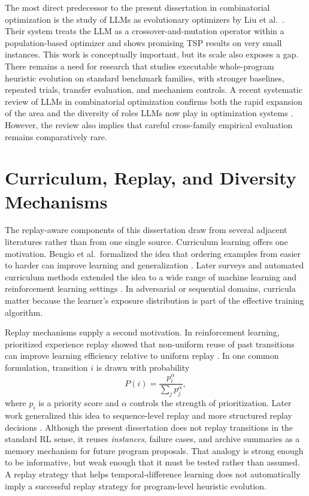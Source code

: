 The most direct predecessor to the present dissertation in combinatorial optimization is the study
of LLMs as evolutionary optimizers by Liu et al.\ \cite{liu2023lmea}. Their system treats the LLM
as a crossover-and-mutation operator within a population-based optimizer and shows promising TSP
results on very small instances. This work is conceptually important, but its scale also exposes a
gap. There remains a need for research that studies executable whole-program heuristic evolution on
standard benchmark families, with stronger baselines, repeated trials, transfer evaluation, and
mechanism controls. A recent systematic review of LLMs in combinatorial optimization confirms both
the rapid expansion of the area and the diversity of roles LLMs now play in optimization systems
\cite{daros2025llmco}. However, the review also implies that careful cross-family empirical
evaluation remains comparatively rare.

\section{Curriculum, Replay, and Diversity Mechanisms}
\label{sec:lit-replay}

The replay-aware components of this dissertation draw from several adjacent literatures rather than
from one single source. Curriculum learning offers one motivation. Bengio et al.\ formalized the
idea that ordering examples from easier to harder can improve learning and generalization
\cite{bengio2009curriculum}. Later surveys and automated curriculum methods extended the idea to a
wide range of machine learning and reinforcement learning settings
\cite{soviany2021curriculumsurvey,graves2017automatedcurriculum}. In adversarial or sequential
domains, curricula matter because the learner's exposure distribution is part of the effective
training algorithm.

Replay mechanisms supply a second motivation. In reinforcement learning, prioritized experience
replay showed that non-uniform reuse of past transitions can improve learning efficiency relative
to uniform replay \cite{schaul2015prioritized}. In one common formulation, transition $i$ is drawn
with probability
\begin{equation}
P(i) = \frac{p_i^{\alpha}}{\sum_j p_j^{\alpha}},
\label{eq:lit-per}
\end{equation}
where $p_i$ is a priority score and $\alpha$ controls the strength of prioritization.
Later work generalized this idea to sequence-level replay and more structured replay decisions
\cite{brittain2019pser}. Although the present dissertation does not replay transitions in the
standard RL sense, it reuses \emph{instances}, failure cases, and archive summaries as a memory
mechanism for future program proposals. That analogy is strong enough to be informative, but weak
enough that it must be tested rather than assumed. A replay strategy that helps temporal-difference
learning does not automatically imply a successful replay strategy for program-level heuristic
evolution.

